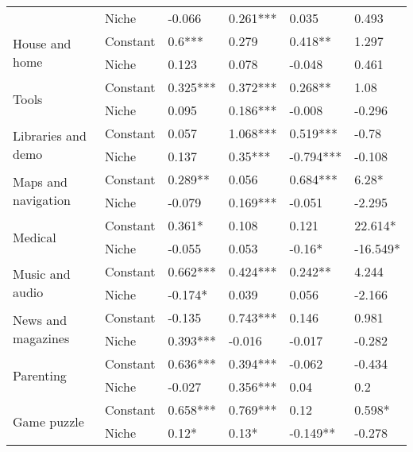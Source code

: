 \begin{longtable}[h!]{llllll}
          & Niche &              -0.066 &    0.261*** &      0.035 &      0.493 \\
\cline{1-6}
\multirow{2}{*}{House and home} & Constant &              0.6*** &       0.279 &    0.418** &      1.297 \\
          & Niche &               0.123 &       0.078 &     -0.048 &      0.461 \\
\cline{1-6}
\multirow{2}{*}{Tools} & Constant &            0.325*** &    0.372*** &    0.268** &       1.08 \\
          & Niche &               0.095 &    0.186*** &     -0.008 &     -0.296 \\
\cline{1-6}
\multirow{2}{*}{Libraries and demo} & Constant &               0.057 &    1.068*** &   0.519*** &      -0.78 \\
          & Niche &               0.137 &     0.35*** &  -0.794*** &     -0.108 \\
\cline{1-6}
\multirow{2}{*}{Maps and navigation} & Constant &             0.289** &       0.056 &   0.684*** &      6.28* \\
          & Niche &              -0.079 &    0.169*** &     -0.051 &     -2.295 \\
\cline{1-6}
\multirow{2}{*}{Medical} & Constant &              0.361* &       0.108 &      0.121 &    22.614* \\
          & Niche &              -0.055 &       0.053 &     -0.16* &   -16.549* \\
\cline{1-6}
\multirow{2}{*}{Music and audio} & Constant &            0.662*** &    0.424*** &    0.242** &      4.244 \\
          & Niche &             -0.174* &       0.039 &      0.056 &     -2.166 \\
\cline{1-6}
\multirow{2}{*}{News and magazines} & Constant &              -0.135 &    0.743*** &      0.146 &      0.981 \\
          & Niche &            0.393*** &      -0.016 &     -0.017 &     -0.282 \\
\cline{1-6}
\multirow{2}{*}{Parenting} & Constant &            0.636*** &    0.394*** &     -0.062 &     -0.434 \\
          & Niche &              -0.027 &    0.356*** &       0.04 &        0.2 \\
\cline{1-6}
\multirow{2}{*}{Game puzzle} & Constant &            0.658*** &    0.769*** &       0.12 &     0.598* \\
          & Niche &               0.12* &       0.13* &   -0.149** &     -0.278 \\

\end{longtable}
